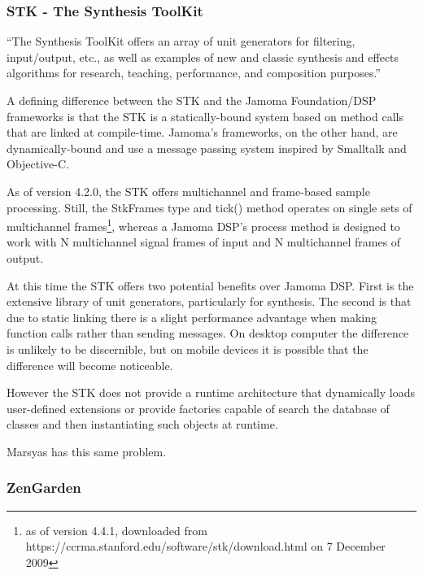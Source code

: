 \documentclass[twoside,10pt]{article}
\begin{document}
\subsubsection{STK - The Synthesis ToolKit} %

``The Synthesis ToolKit offers an array of unit generators for filtering, input/output, etc., as well as examples of new and classic synthesis and effects algorithms for research, teaching, performance, and composition purposes.''\cite{Cook:1999}

A defining difference between the STK and the Jamoma Foundation/DSP frameworks is that the STK is a statically-bound system based on method calls that are linked at compile-time.  Jamoma's frameworks, on the other hand, are dynamically-bound and use a message passing system inspired by Smalltalk\cite{Krasner:1988} and Objective-C\cite{Cox:1986}.

As of version 4.2.0, the STK offers multichannel and frame-based sample processing\cite{Scavone:2005}. Still, the StkFrames type and tick() method operates on single sets of multichannel frames\footnote{as of version 4.4.1, downloaded from https://ccrma.stanford.edu/software/stk/download.html on 7 December 2009}, whereas a Jamoma DSP's process method is designed to work with N multichannel signal frames of input and N multichannel frames of output.

At this time the STK offers two potential benefits over Jamoma DSP.  First is the extensive library of unit generators, particularly for synthesis.  The second is that due to static linking there is a slight performance advantage when making function calls rather than sending messages.  On desktop computer the difference is unlikely to be discernible, but on mobile devices it is possible that the difference will become noticeable.

However the STK does not provide a runtime architecture that dynamically loads user-defined extensions or provide factories capable of search the database of classes and then instantiating such objects at runtime.

Marsyas has this same problem.  




\subsubsection{ZenGarden} %
\end{document}

